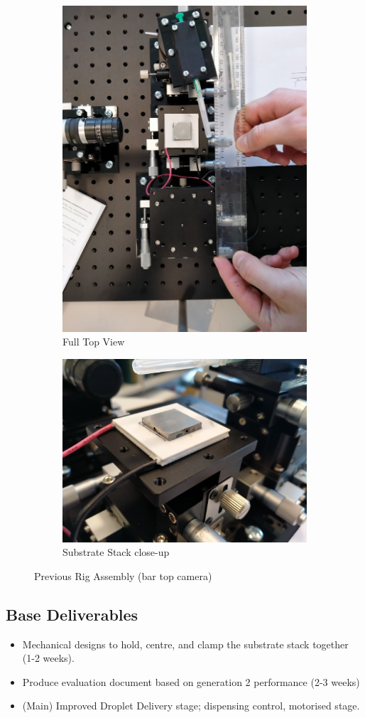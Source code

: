 \documentclass[11pt, a4paper, twoside, openright]{report}
\begin{document}
\begin{figure}
  \begin{subfigure}{.5\textwidth}
    \centering
    \includegraphics[height=.5\linewidth]{Figures/Full_rig_top.jpg}
    \caption{Full Top View}
  \end{subfigure}%
  \begin{subfigure}{.5\textwidth}
    \centering
    \includegraphics[height=.5\linewidth]{Figures/substrate_stack.jpg}
    \caption{Substrate Stack close-up}
  \end{subfigure}
  \caption{Previous Rig Assembly (bar top camera)}
  \label{fig::old_rig}
\end{figure}


\subsection{Base Deliverables}
\begin{itemize}
  \item Mechanical designs to hold, centre, and clamp the substrate stack  together (1-2 weeks).
  \item Produce evaluation document based on generation 2 performance (2-3 weeks)
  \item (Main) Improved Droplet Delivery stage; dispensing control, motorised stage.
\end{itemize}
\end{document}

